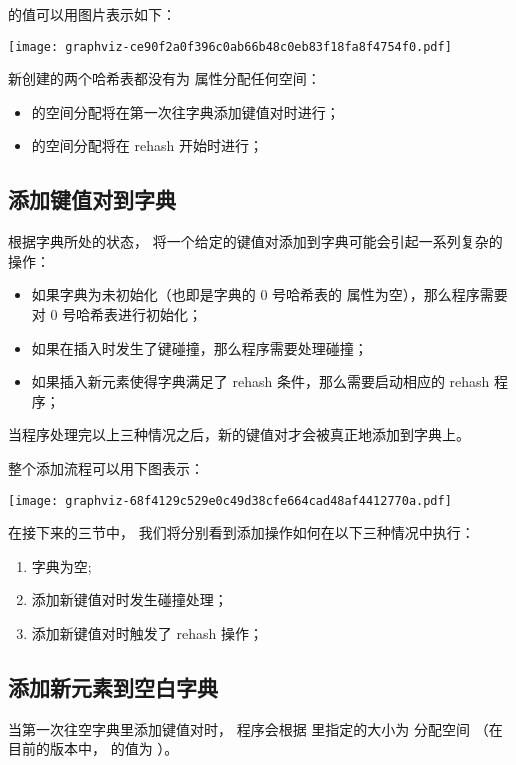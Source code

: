 \documentclass[a4paper,11pt,english]{sphinxmanual}
\begin{document}
 的值可以用图片表示如下：

\texttt{[image: graphviz-ce90f2a0f396c0ab66b48c0eb83f18fa8f4754f0.pdf]}

新创建的两个哈希表都没有为  属性分配任何空间：
\begin{itemize}
\item {} 
 的空间分配将在第一次往字典添加键值对时进行；

\item {} 
 的空间分配将在 rehash 开始时进行；

\end{itemize}


\subsection{添加键值对到字典}
\label{internal-datastruct/dict:id9}
根据字典所处的状态，
将一个给定的键值对添加到字典可能会引起一系列复杂的操作：
\begin{itemize}
\item {} 
如果字典为未初始化（也即是字典的 0 号哈希表的  属性为空），那么程序需要对 0 号哈希表进行初始化；

\item {} 
如果在插入时发生了键碰撞，那么程序需要处理碰撞；

\item {} 
如果插入新元素使得字典满足了 rehash 条件，那么需要启动相应的 rehash 程序；

\end{itemize}

当程序处理完以上三种情况之后，新的键值对才会被真正地添加到字典上。

整个添加流程可以用下图表示：

\texttt{[image: graphviz-68f4129c529e0c49d38cfe664cad48af4412770a.pdf]}

在接下来的三节中，
我们将分别看到添加操作如何在以下三种情况中执行：
\begin{enumerate}
\item {} 
字典为空;

\item {} 
添加新键值对时发生碰撞处理；

\item {} 
添加新键值对时触发了 rehash 操作；

\end{enumerate}


\subsection{添加新元素到空白字典}
\label{internal-datastruct/dict:id10}\label{internal-datastruct/dict:add-when-empty}
当第一次往空字典里添加键值对时，
程序会根据  里指定的大小为
 分配空间
（在目前的版本中，  的值为  ）。
\end{document}
